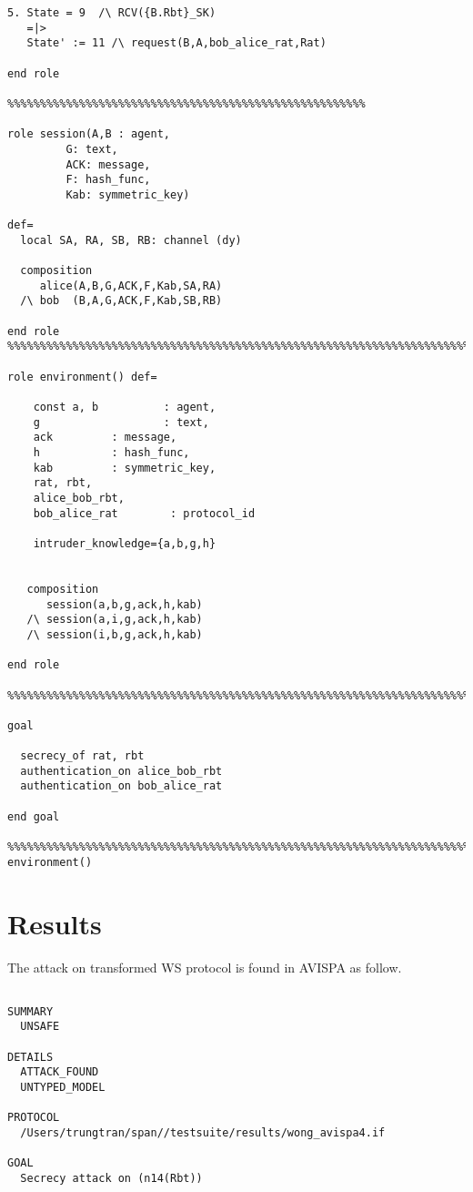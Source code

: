 {{\begin{Verbatim}[fontsize=\small]
5. State = 9  /\ RCV({B.Rbt}_SK)
   =|>
   State' := 11 /\ request(B,A,bob_alice_rat,Rat)

end role

%%%%%%%%%%%%%%%%%%%%%%%%%%%%%%%%%%%%%%%%%%%%%%%%%%%%%%%

role session(A,B : agent,
	     G: text,
         ACK: message,
	     F: hash_func,
	     Kab: symmetric_key)

def=
  local SA, RA, SB, RB: channel (dy)

  composition
     alice(A,B,G,ACK,F,Kab,SA,RA)
  /\ bob  (B,A,G,ACK,F,Kab,SB,RB)

end role
%%%%%%%%%%%%%%%%%%%%%%%%%%%%%%%%%%%%%%%%%%%%%%%%%%%%%%%%%%%%%%%%%%%%%%%%

role environment() def=

    const a, b          : agent,
	g                   : text,
	ack		    : message,
	h           : hash_func,
    kab         : symmetric_key,
    rat, rbt,
	alice_bob_rbt,
	bob_alice_rat        : protocol_id
 
    intruder_knowledge={a,b,g,h}


   composition
      session(a,b,g,ack,h,kab)
   /\ session(a,i,g,ack,h,kab)
   /\ session(i,b,g,ack,h,kab)

end role

%%%%%%%%%%%%%%%%%%%%%%%%%%%%%%%%%%%%%%%%%%%%%%%%%%%%%%%%%%%%%%%%%%%%%%%%

goal

  secrecy_of rat, rbt
  authentication_on alice_bob_rbt
  authentication_on bob_alice_rat

end goal

%%%%%%%%%%%%%%%%%%%%%%%%%%%%%%%%%%%%%%%%%%%%%%%%%%%%%%%%%%%%%%%%%%%%%%%%
environment()

\end{Verbatim}

\section{Results}
The attack on transformed WS protocol is found in AVISPA as follow.

{\small 
\begin{Verbatim}[fontsize=\small]

SUMMARY
  UNSAFE

DETAILS
  ATTACK_FOUND
  UNTYPED_MODEL

PROTOCOL
  /Users/trungtran/span//testsuite/results/wong_avispa4.if

GOAL
  Secrecy attack on (n14(Rbt))


\end{Verbatim}}}}
